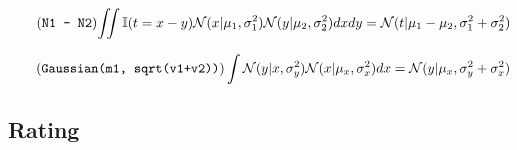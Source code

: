\documentclass[article]{jss}
\newif\ifen
\newif\ifes
\newcommand{\en}[1]{\ifen#1\fi}
\newcommand{\es}[1]{\ifes#1\fi}
\newcommand{\N}{\mathcal{N}}
\begin{document}
%
\vspace{-0.5cm}
%
\begin{equation} \tag{\texttt{N1 - N2}} \label{eq:resta_normales}
\begin{split}
\iint \mathbb{I}(t = x - y) \N(x|\mu_1, \sigma_1^2)\N(y|\mu_2, \sigma_2^2) dxdy = \N(t|\mu_1 - \mu_2,\sigma_1^2 + \sigma_2^2)
\end{split}
\end{equation}
%
\en{For its part, the following property will be computed ``by hand''.}
\es{Por su parte, la siguiente propiedad la computaremos ``a mano''.}
%
\begin{equation} \label{eq:normal_de_normal} \tag{\texttt{Gaussian(m1, sqrt(v1+v2))}}
\int \N(y| x, \sigma_y^2) \N(x| \mu_x, \sigma_x^2) dx = \N(y|\mu_x,\sigma_y^2 + \sigma_x^2)   
\end{equation}
%
\en{Note that the value of \texttt{m1},\texttt{v1},\texttt{v2} has been previously defined.}
\es{Notar que el valor de \texttt{m1},\texttt{v1},\texttt{v2} a sido definido previamente.}

\subsection{Rating} \label{sec:rating}
\end{document}
